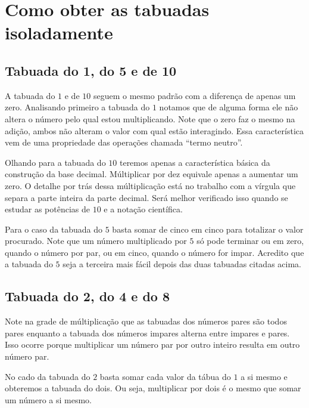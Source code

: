 




\section{Como obter as tabuadas isoladamente}

\subsection{Tabuada do 1, do 5 e de 10}

A tabuada do $1$ e de $10$ seguem o mesmo padrão com a diferença de apenas um zero. Analisando primeiro a tabuada do $1$ notamos que de alguma forma ele não altera o número pelo qual estou multiplicando. Note que o zero faz o mesmo na adição, ambos não alteram o valor com qual estão interagindo. Essa característica vem de uma propriedade das operações chamada ``termo neutro''. 

Olhando para a tabuada do $10$ teremos apenas a característica básica da construção da base decimal. Múltiplicar por dez equivale apenas a aumentar um zero. O detalhe por trás dessa múltiplicação está no trabalho com a vírgula que separa a parte inteira da parte decimal. Será melhor verificado isso quando se estudar as potências de $10$ e a notação científica.

Para o caso da tabuada do $5$ basta somar de cinco em cinco para totalizar o valor procurado. Note que um número multiplicado por $5$ só pode terminar ou em zero, quando o número por par, ou em cinco, quando o número for impar. Acredito que a tabuada do $5$ seja a terceira mais fácil depois das duas tabuadas citadas acima.

\subsection{Tabuada do 2, do 4 e do 8}

Note na grade de múltiplicação que as tabuadas dos números pares são todos pares enquanto a tabuada dos números impares alterna entre impares e pares. Isso ocorre porque multiplicar um número par por outro inteiro resulta em outro número par.

No cado da tabuada do $2$ basta somar cada valor da tábua do $1$ a si mesmo e obteremos a tabuada do dois. Ou seja, multiplicar por dois é o mesmo que somar um número a si mesmo. 

